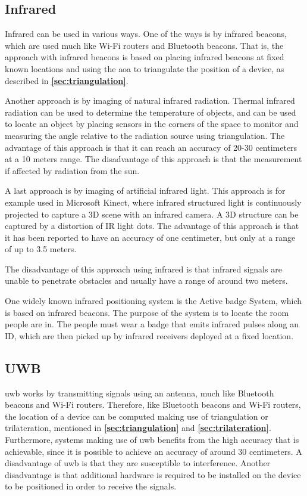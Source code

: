 \subsection{Infrared}
Infrared can be used in various ways. One of the ways is by infrared beacons, which are used much like Wi-Fi routers and Bluetooth beacons. That is, the approach with infrared beacons is based on placing infrared beacons at fixed known locations and using the \gls{aoa} to triangulate the position of a device, as described in \textbf{\autoref{sec:triangulation}}.\cite{HabilitationThesis}

Another approach is by imaging of natural infrared radiation. Thermal infrared radiation can be used to determine the temperature of objects, and can be used to locate an object by placing sensors in the corners of the space to monitor and measuring the angle relative to the radiation source using triangulation.
The advantage of this approach is that it can reach an accuracy of 20-30 centimeters at a 10 meters range.
The disadvantage of this approach is that the measurement if affected by radiation from the sun.\cite{HabilitationThesis}

A last approach is by imaging of artificial infrared light. This approach is for example used in Microsoft Kinect, where infrared structured light is continuously projected to capture a 3D scene with an infrared camera. A 3D structure can be captured by a distortion of IR light dots.
The advantage of this approach is that it has been reported to have an accuracy of one centimeter, but only at a range of up to 3.5 meters.\cite{HabilitationThesis}

The disadvantage of this approach using infrared is that infrared signals are unable to penetrate obstacles and usually have a range of around two meters\cite{HabilitationThesis}.

One widely known infrared positioning system is the Active badge System, which is based on infrared beacons. The purpose of the system is to locate the room people are in. The people must wear a badge that emits infrared pulses along an ID, which are then picked up by infrared receivers deployed at a fixed location.

\subsection{UWB}
\gls{uwb} works by transmitting signals using an antenna, much like Bluetooth beacons and Wi-Fi routers. Therefore, like Bluetooth beacons and Wi-Fi routers, the location of a device can be computed making use of triangulation or trilateration, mentioned in \textbf{\autoref{sec:triangulation}} and \textbf{\autoref{sec:trilateration}}. Furthermore, systems making use of \gls{uwb} benefits from the high accuracy that is achievable, since it is possible to achieve an accuracy of around 30 centimeters. A disadvantage of \gls{uwb} is that they are susceptible to interference.\cite{oriient} Another disadvantage is that additional hardware is required to be installed on the device to be positioned in order to receive the signals\cite{LundIMU}.

